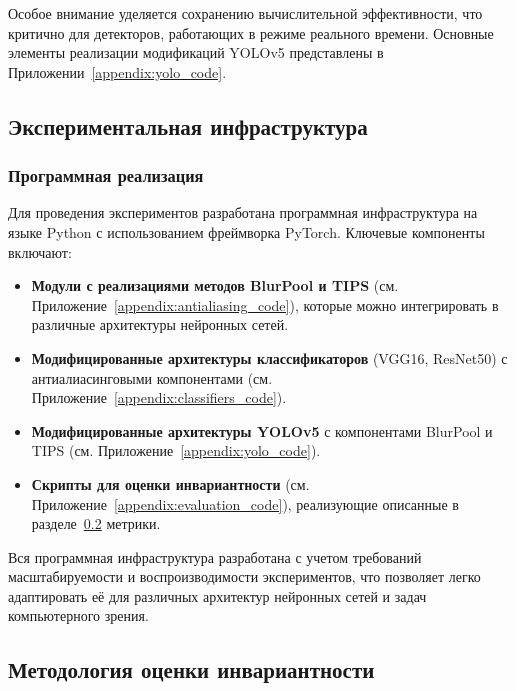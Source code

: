 Особое внимание уделяется сохранению вычислительной эффективности, что критично для детекторов, работающих в режиме реального времени. Основные элементы реализации модификаций YOLOv5 представлены в Приложении~\ref{appendix:yolo_code}.

\subsection{Экспериментальная инфраструктура}
\label{sec:infrastructure}

\subsubsection{Программная реализация}
\label{sec:implementation}

Для проведения экспериментов разработана программная инфраструктура на языке Python с использованием фреймворка PyTorch. Ключевые компоненты включают:

\begin{itemize}
    \item \textbf{Модули с реализациями методов BlurPool и TIPS} (см. Приложение~\ref{appendix:antialiasing_code}), которые можно интегрировать в различные архитектуры нейронных сетей.
    
    \item \textbf{Модифицированные архитектуры классификаторов} (VGG16, ResNet50) с антиалиасинговыми компонентами (см. Приложение~\ref{appendix:classifiers_code}).
    
    \item \textbf{Модифицированные архитектуры YOLOv5} с компонентами BlurPool и TIPS (см. Приложение~\ref{appendix:yolo_code}).
    
    \item \textbf{Скрипты для оценки инвариантности} (см. Приложение~\ref{appendix:evaluation_code}), реализующие описанные в разделе~\ref{sec:evaluation} метрики.
\end{itemize}

Вся программная инфраструктура разработана с учетом требований масштабируемости и воспроизводимости экспериментов, что позволяет легко адаптировать её для различных архитектур нейронных сетей и задач компьютерного зрения.



\subsection{Методология оценки инвариантности}
\label{sec:evaluation}

